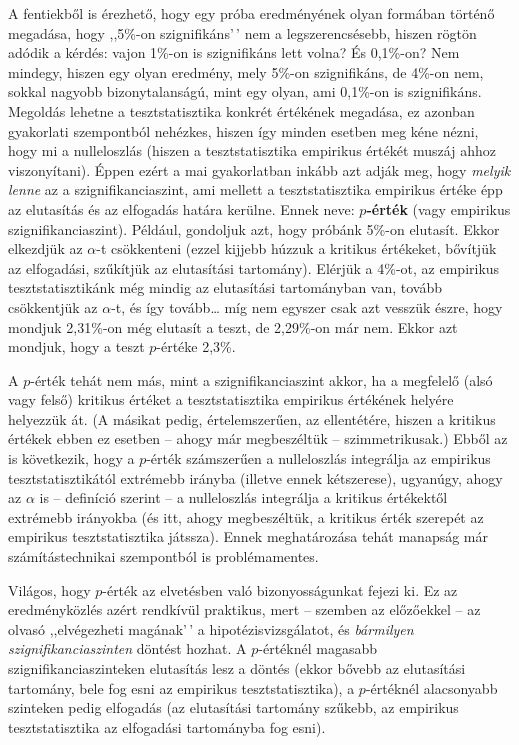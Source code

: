 \documentclass[
]{book}
\begin{document}
A fentiekből is érezhető, hogy egy próba eredményének olyan formában történő megadása, hogy ,,5\%-on szignifikáns'\,' nem a legszerencsésebb, hiszen rögtön adódik a kérdés: vajon 1\%-on is szignifikáns lett volna? És 0,1\%-on? Nem mindegy, hiszen egy olyan eredmény, mely 5\%-on szignifikáns, de 4\%-on nem, sokkal nagyobb bizonytalanságú, mint egy olyan, ami 0,1\%-on is szignifikáns. Megoldás lehetne a tesztstatisztika konkrét értékének megadása, ez azonban gyakorlati szempontból nehézkes, hiszen így minden esetben meg kéne nézni, hogy mi a nulleloszlás (hiszen a tesztstatisztika empirikus értékét muszáj ahhoz viszonyítani). Éppen ezért a mai gyakorlatban inkább azt adják meg, hogy \emph{melyik lenne} az a szignifikanciaszint, ami mellett a tesztstatisztika empirikus értéke épp az elutasítás és az elfogadás határa kerülne. Ennek neve: \textbf{\(p\)-érték} (vagy empirikus szignifikanciaszint). Például, gondoljuk azt, hogy próbánk 5\%-on elutasít. Ekkor elkezdjük az \(\alpha\)-t csökkenteni (ezzel kijjebb húzzuk a kritikus értékeket, bővítjük az elfogadási, szűkítjük az elutasítási tartomány). Elérjük a 4\%-ot, az empirikus tesztstatisztikánk még mindig az elutasítási tartományban van, tovább csökkentjük az \(\alpha\)-t, és így tovább\dots{} míg nem egyszer csak azt vesszük észre, hogy mondjuk 2,31\%-on még elutasít a teszt, de 2,29\%-on már nem. Ekkor azt mondjuk, hogy a teszt \(p\)-értéke 2,3\%.

A \(p\)-érték tehát nem más, mint a szignifikanciaszint akkor, ha a megfelelő (alsó vagy felső) kritikus értéket a tesztstatisztika empirikus értékének helyére helyezzük át. (A másikat pedig, értelemszerűen, az ellentétére, hiszen a kritikus értékek ebben ez esetben -- ahogy már megbeszéltük -- szimmetrikusak.) Ebből az is következik, hogy a \(p\)-érték számszerűen a nulleloszlás integrálja az empirikus tesztstatisztikától extrémebb irányba (illetve ennek kétszerese), ugyanúgy, ahogy az \(\alpha\) is -- definíció szerint -- a nulleloszlás integrálja a kritikus értékektől extrémebb irányokba (és itt, ahogy megbeszéltük, a kritikus érték szerepét az empirikus tesztstatisztika játssza). Ennek meghatározása tehát manapság már számítástechnikai szempontból is problémamentes.

Világos, hogy \(p\)-érték az elvetésben való bizonyosságunkat fejezi ki. Ez az eredményközlés azért rendkívül praktikus, mert -- szemben az előzőekkel -- az olvasó ,,elvégezheti magának'\,' a hipotézisvizsgálatot, és \emph{bármilyen szignifikanciaszinten} döntést hozhat. A \(p\)-értéknél magasabb szignifikanciaszinteken elutasítás lesz a döntés (ekkor bővebb az elutasítási tartomány, bele fog esni az empirikus tesztstatisztika), a \(p\)-értéknél alacsonyabb szinteken pedig elfogadás (az elutasítási tartomány szűkebb, az empirikus tesztstatisztika az elfogadási tartományba fog esni).
\end{document}
